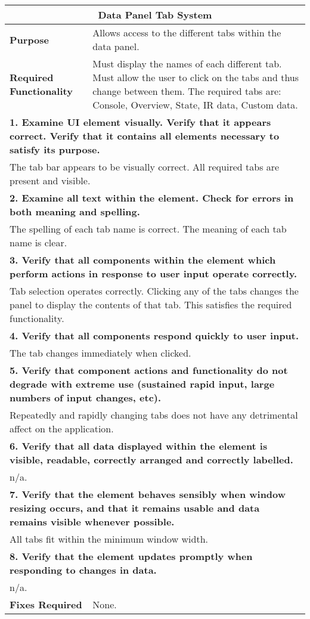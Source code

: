 \begin{longtable}{ l p{10cm} }
\hline
 \multicolumn{2}{c}{\textbf{Data Panel Tab System}}\\
 \hline
 \textbf{Purpose} & Allows access to the different tabs within the data panel.\\
 \textbf{Required Functionality} & Must display the names of each different tab. Must allow the user to click on the tabs and thus change between them. The required tabs are: Console, Overview, State, IR data, Custom data.\\
 \hline
 \multicolumn{2}{p{14cm}}{\textbf{1. Examine UI element visually. Verify that it appears correct. Verify that it contains all elements necessary to satisfy its purpose.}}\\
 \multicolumn{2}{p{14cm}}{The tab bar appears to be visually correct. All required tabs are present and visible.}\\
 \hline
 \multicolumn{2}{p{14cm}}{\textbf{2. Examine all text within the element. Check for errors in both meaning and spelling.}}\\
 \multicolumn{2}{p{14cm}}{The spelling of each tab name is correct. The meaning of each tab name is clear.}\\
 \hline
 \multicolumn{2}{p{14cm}}{\textbf{3. Verify that all components within the element which perform actions in response to user input operate correctly.}}\\
 \multicolumn{2}{p{14cm}}{Tab selection operates correctly. Clicking any of the tabs changes the panel to display the contents of that tab. This satisfies the required functionality.}\\
 \hline
 \multicolumn{2}{p{14cm}}{\textbf{4. Verify that all components respond quickly to user input.}}\\
 \multicolumn{2}{p{14cm}}{The tab changes immediately when clicked.}\\
 \hline
 \multicolumn{2}{p{14cm}}{\textbf{5. Verify that component actions and functionality do not degrade with extreme use (sustained rapid input, large numbers of input changes, etc).}}\\
 \multicolumn{2}{p{14cm}}{Repeatedly and rapidly changing tabs does not have any detrimental affect on the application.}\\
 \hline
 \multicolumn{2}{p{14cm}}{\textbf{6. Verify that all data displayed within the element is visible, readable, correctly arranged and correctly labelled.}}\\
 \multicolumn{2}{p{14cm}}{n/a.}\\
 \hline
 \multicolumn{2}{p{14cm}}{\textbf{7. Verify that the element behaves sensibly when window resizing occurs, and that it remains usable and data remains visible whenever possible.}}\\
 \multicolumn{2}{p{14cm}}{All tabs fit within the minimum window width.}\\
 \hline
 \multicolumn{2}{p{14cm}}{\textbf{8. Verify that the element updates promptly when responding to changes in data.}}\\
 \multicolumn{2}{p{14cm}}{n/a.}\\
 \hline
 \textbf{Fixes Required} & None.\\
 \bottomrule
\end{longtable}
